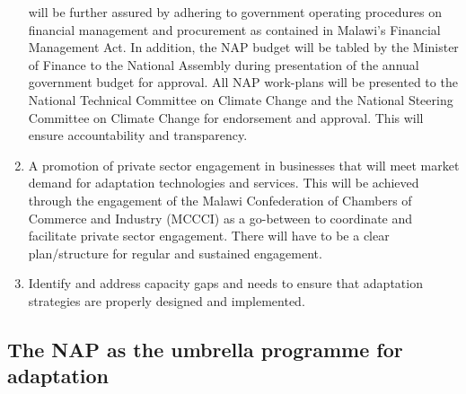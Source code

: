 \documentclass[
]{book}
\begin{document}
\begin{enumerate}
  will be further assured by adhering to government operating procedures on financial management and procurement as contained in Malawi's Financial Management Act.
  In addition, the NAP budget will be tabled by the Minister of Finance to the National Assembly during presentation of the annual government budget for approval.
  All NAP work-plans will be presented to the National Technical Committee on Climate Change and the National Steering Committee on Climate Change for endorsement and approval. This will ensure accountability and transparency.
\item
  A promotion of private sector engagement in businesses that will meet market demand for adaptation technologies and services. This will be achieved through
  the engagement of the Malawi Confederation of Chambers of Commerce and Industry (MCCCI) as a go-between to coordinate and facilitate private sector
  engagement. There will have to be a clear plan/structure for regular and sustained engagement.
\item
  Identify and address capacity gaps and needs to ensure that adaptation strategies are properly designed and implemented.
\end{enumerate}

\hypertarget{the-nap-as-the-umbrella-programme-for-adaptation}{%
\subsection{The NAP as the umbrella programme for adaptation}\label{the-nap-as-the-umbrella-programme-for-adaptation}}
\end{document}
